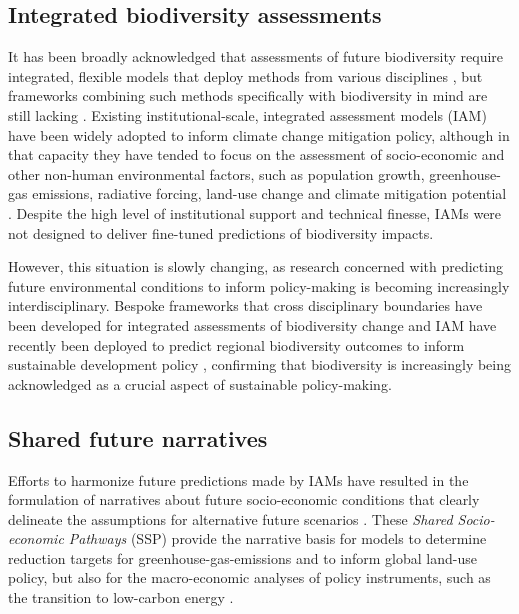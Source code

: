 \subsection{Integrated biodiversity assessments}
It has been broadly acknowledged that assessments of future biodiversity require integrated, flexible models that deploy methods from various disciplines \citep{ipbes_summary_2019}, but frameworks combining such methods specifically with biodiversity in mind are still lacking \citep{titeux_global_2017}. Existing institutional-scale, integrated assessment models (IAM) have been widely adopted to inform climate change mitigation policy, although in that capacity they have tended to focus on the assessment of socio-economic and other non-human environmental factors, such as population growth, greenhouse-gas emissions, radiative forcing, land-use change and climate mitigation potential \citep{riahi_shared_2017}. Despite the high level of institutional support and technical finesse, IAMs were not designed to deliver fine-tuned predictions of biodiversity impacts.

However, this situation is slowly changing, as research concerned with predicting future environmental conditions to inform policy-making is becoming increasingly interdisciplinary. Bespoke frameworks that cross disciplinary boundaries have been developed for integrated assessments of biodiversity change \citep{newbold2019climate, kapitza_assessing_2021, leclere_bending_2020} and IAM have recently been deployed to predict regional biodiversity outcomes to inform sustainable development policy \citep{veerkamp_future_2020}, confirming that biodiversity is increasingly being acknowledged as a crucial aspect of sustainable policy-making.

\subsection{Shared future narratives}
Efforts to harmonize future predictions made by IAMs have resulted in the formulation of narratives about future socio-economic conditions that clearly delineate the assumptions for alternative future scenarios \citep{oneill_new_2014, oneill_roads_2017}. These \textit{Shared Socio-economic Pathways} (SSP) \citep{oneill_new_2014} provide the narrative basis for models to determine reduction targets for greenhouse-gas-emissions and to inform global land-use policy, but also for the macro-economic analyses of policy instruments, such as the transition to low-carbon energy \citep{riahi_shared_2017}. 

